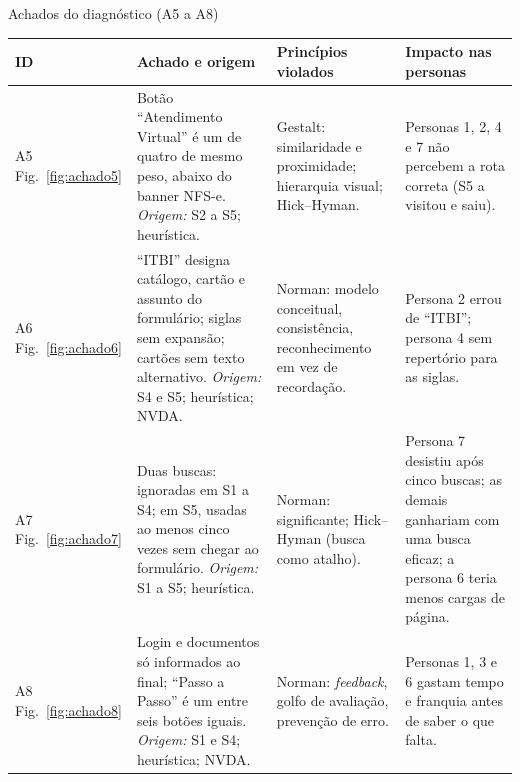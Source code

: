 \documentclass[
  12pt,
  oneside,
  a4paper,
  chapter=TITLE,
  section=TITLE,
  english,
  brazilian
]{abntex2}
\renewcommand{\fonte}[1]{\par\vspace{3pt}{\footnotesize\raggedright\noindent Fonte: #1\par}\vspace{4pt}}%
\begin{document}
\begin{quadro}[!htbp]
  \caption{Achados do diagnóstico (A5 a A8)}\label{qua:achados2}
  \centering\footnotesize
  \begin{tabularx}{\textwidth}{|P{1.3cm}|Y|Y|Y|}\hline
    ID & Achado e origem & Princípios violados & Impacto nas personas \\\hline
    A5 \newline Fig.~\ref{fig:achado5} & Botão ``Atendimento Virtual'' é um de quatro de mesmo peso, abaixo do banner NFS-e. \textit{Origem:} S2 a S5; heurística. & Gestalt: similaridade e proximidade; hierarquia visual; Hick--Hyman. & Personas 1, 2, 4 e 7 não percebem a rota correta (S5 a visitou e saiu). \\\hline
    A6 \newline Fig.~\ref{fig:achado6} & ``ITBI'' designa catálogo, cartão e assunto do formulário; siglas sem expansão; cartões sem texto alternativo. \textit{Origem:} S4 e S5; heurística; NVDA. & Norman: modelo conceitual, consistência, reconhecimento em vez de recordação. & Persona 2 errou de ``ITBI''; persona 4 sem repertório para as siglas. \\\hline
    A7 \newline Fig.~\ref{fig:achado7} & Duas buscas: ignoradas em S1 a S4; em S5, usadas ao menos cinco vezes sem chegar ao formulário. \textit{Origem:} S1 a S5; heurística. & Norman: significante; Hick--Hyman (busca como atalho). & Persona 7 desistiu após cinco buscas; as demais ganhariam com uma busca eficaz; a persona 6 teria menos cargas de página. \\\hline
    A8 \newline Fig.~\ref{fig:achado8} & Login e documentos só informados ao final; ``Passo a Passo'' é um entre seis botões iguais. \textit{Origem:} S1 e S4; heurística; NVDA. & Norman: \textit{feedback}, golfo de avaliação, prevenção de erro. & Personas 1, 3 e 6 gastam tempo e franquia antes de saber o que falta. \\\hline
  \end{tabularx}
  \fonte{Elaborado pelos autores (2026).}
\end{quadro}
\end{document}
